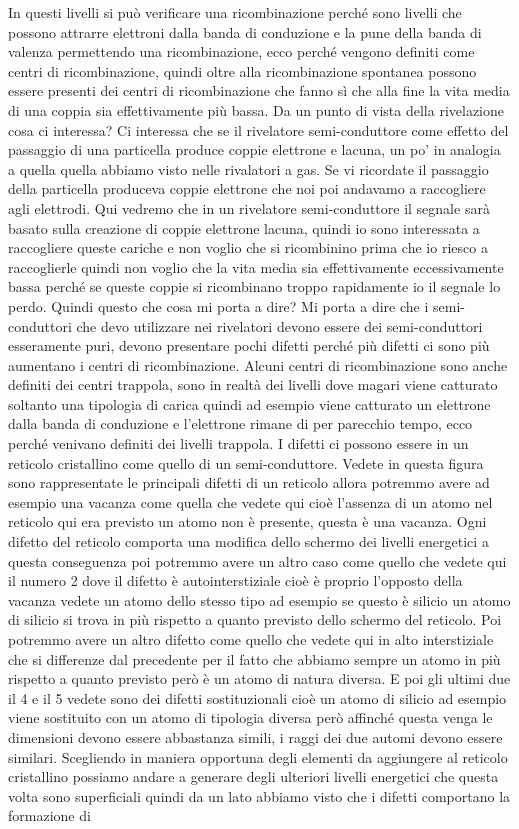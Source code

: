 In questi livelli si può verificare una ricombinazione perché sono livelli che possono attrarre elettroni dalla banda di conduzione e la pune della banda di valenza permettendo una ricombinazione, ecco perché vengono definiti come centri di ricombinazione, quindi oltre alla ricombinazione spontanea possono essere presenti dei centri di ricombinazione che fanno sì che alla fine la vita media di una coppia sia effettivamente più bassa. Da un punto di vista della rivelazione cosa ci interessa? Ci interessa che se il rivelatore semi-conduttore come effetto del passaggio di una particella produce coppie elettrone e lacuna, un po' in analogia a quella quella abbiamo visto nelle rivalatori a gas. Se vi ricordate il passaggio della particella produceva coppie elettrone che noi poi andavamo a raccogliere agli elettrodi. Qui vedremo che in un rivelatore semi-conduttore il segnale sarà basato sulla creazione di coppie elettrone lacuna, quindi io sono interessata a raccogliere queste cariche e non voglio che si ricombinino prima che io riesco a raccoglierle quindi non voglio che la vita media sia effettivamente eccessivamente bassa perché se queste coppie si ricombinano troppo rapidamente io il segnale lo perdo. Quindi questo che cosa mi porta a dire? Mi porta a dire che i semi-conduttori che devo utilizzare nei rivelatori devono essere dei semi-conduttori esseramente puri, devono presentare pochi difetti perché più difetti ci sono più aumentano i centri di ricombinazione. Alcuni centri di ricombinazione sono anche definiti dei centri trappola, sono in realtà dei livelli dove magari viene catturato soltanto una tipologia di carica quindi ad esempio viene catturato un elettrone dalla banda di conduzione e l'elettrone rimane di per parecchio tempo, ecco perché venivano definiti dei livelli trappola. I difetti ci possono essere in un reticolo cristallino come quello di un semi-conduttore. Vedete in questa figura sono rappresentate le principali difetti di un reticolo allora potremmo avere ad esempio una vacanza come quella che vedete qui cioè l'assenza di un atomo nel reticolo qui era previsto un atomo non è presente, questa è una vacanza. Ogni difetto del reticolo comporta una modifica dello schermo dei livelli energetici a questa conseguenza poi potremmo avere un altro caso come quello che vedete qui il numero 2 dove il difetto è autointerstiziale cioè è proprio l'opposto della vacanza vedete un atomo dello stesso tipo ad esempio se questo è silicio un atomo di silicio si trova in più rispetto a quanto previsto dello schermo del reticolo. Poi potremmo avere un altro difetto come quello che vedete qui in alto interstiziale che si differenze dal precedente per il fatto che abbiamo sempre un atomo in più rispetto a quanto previsto però è un atomo di natura diversa. E poi gli ultimi due il 4 e il 5 vedete sono dei difetti sostituzionali cioè un atomo di silicio ad esempio viene sostituito con un atomo di tipologia diversa però affinché questa venga le dimensioni devono essere abbastanza simili, i raggi dei due automi devono essere similari. Scegliendo in maniera opportuna degli elementi da aggiungere al reticolo cristallino possiamo andare a generare degli ulteriori livelli energetici che questa volta sono superficiali quindi da un lato abbiamo visto che i difetti comportano la formazione di 